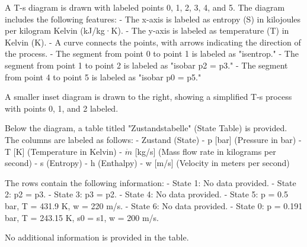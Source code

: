 A T-s diagram is drawn with labeled points 0, 1, 2, 3, 4, and 5. The diagram includes the following features:  
- The x-axis is labeled as entropy (S) in kilojoules per kilogram Kelvin (kJ/kg·K).  
- The y-axis is labeled as temperature (T) in Kelvin (K).  
- A curve connects the points, with arrows indicating the direction of the process.  
- The segment from point 0 to point 1 is labeled as "isentrop."  
- The segment from point 1 to point 2 is labeled as "isobar p2 = p3."  
- The segment from point 4 to point 5 is labeled as "isobar p0 = p5."  

A smaller inset diagram is drawn to the right, showing a simplified T-s process with points 0, 1, and 2 labeled.  

Below the diagram, a table titled "Zustandstabelle" (State Table) is provided. The columns are labeled as follows:  
- Zustand (State)  
- p [bar] (Pressure in bar)  
- T [K] (Temperature in Kelvin)  
- \( \dot{m} \) [kg/s] (Mass flow rate in kilograms per second)  
- s (Entropy)  
- h (Enthalpy)  
- w [m/s] (Velocity in meters per second)  

The rows contain the following information:  
- State 1: No data provided.  
- State 2: p2 = p3.  
- State 3: p3 = p2.  
- State 4: No data provided.  
- State 5: p = 0.5 bar, T = 431.9 K, w = 220 m/s.  
- State 6: No data provided.  
- State 0: p = 0.191 bar, T = 243.15 K, s0 = s1, w = 200 m/s.  

No additional information is provided in the table.